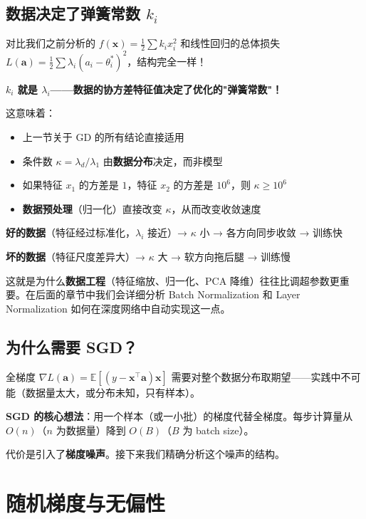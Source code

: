 \documentclass[12pt, a4paper]{ctexart}
\begin{document}
\subsection{数据决定了弹簧常数 $k_i$}

对比我们之前分析的 $f(\bm{x}) = \frac{1}{2}\sum k_i x_i^2$ 和线性回归的总体损失 $L(\mathbf{a}) = \frac{1}{2}\sum \lambda_i (a_i - \theta_i^*)^2$，结构完全一样！

\textbf{$k_i$ 就是 $\lambda_i$——数据的协方差特征值决定了优化的"弹簧常数"！}

这意味着：
\begin{itemize}
    \item 上一节关于 GD 的所有结论直接适用
    \item 条件数 $\kappa = \lambda_d/\lambda_1$ 由\textbf{数据分布}决定，而非模型
    \item 如果特征 $x_1$ 的方差是 $1$，特征 $x_2$ 的方差是 $10^6$，则 $\kappa \geq 10^6$
    \item \textbf{数据预处理}（归一化）直接改变 $\kappa$，从而改变收敛速度
\end{itemize}

\begin{insight}[数据的质量直接决定了优化的难度]
\textbf{好的数据}（特征经过标准化，$\lambda_i$ 接近）→ $\kappa$ 小 → 各方向同步收敛 → 训练快

\textbf{坏的数据}（特征尺度差异大）→ $\kappa$ 大 → 软方向拖后腿 → 训练慢

这就是为什么\textbf{数据工程}（特征缩放、归一化、PCA 降维）往往比调超参数更重要。在后面的章节中我们会详细分析 Batch Normalization 和 Layer Normalization 如何在深度网络中自动实现这一点。
\end{insight}

\subsection{为什么需要 SGD？}

全梯度 $\nabla L(\mathbf{a}) = \mathbb{E}[(y - \mathbf{x}^\top\mathbf{a})\mathbf{x}]$ 需要对整个数据分布取期望——实践中不可能（数据量太大，或分布未知，只有样本）。

\textbf{SGD 的核心想法}：用一个样本（或一小批）的梯度代替全梯度。每步计算量从 $O(n)$（$n$ 为数据量）降到 $O(B)$（$B$ 为 batch size）。

代价是引入了\textbf{梯度噪声}。接下来我们精确分析这个噪声的结构。


\section{随机梯度与无偏性}
\end{document}
